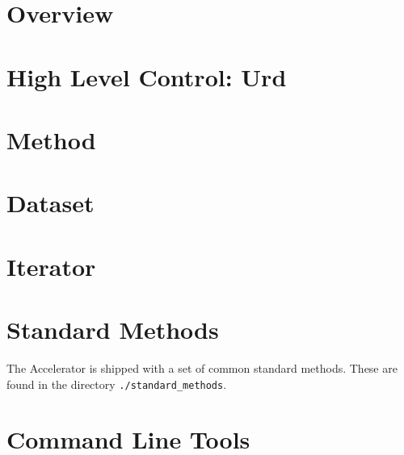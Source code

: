 \documentclass[a4paper]{report}
\begin{document}




\chapter{Overview}


\chapter{High Level Control:  Urd}


\chapter{Method}


\chapter{Dataset}


\chapter{Iterator}


\chapter{Standard Methods}
The Accelerator is shipped with a set of common standard methods.
These are found in the directory \texttt{./standard\_methods}.


\chapter{Command Line Tools}


%
\end{document}
